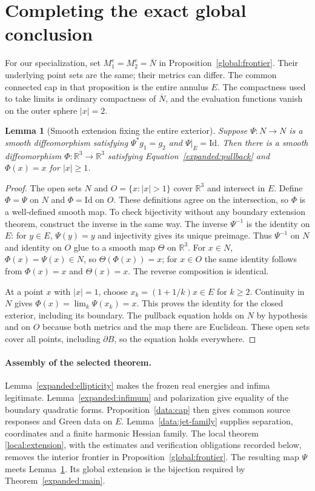 \documentclass[11pt]{article}
\newtheorem{lemma}[theorem]{Lemma}
\theoremstyle{definition}
\theoremstyle{remark}
\newcommand{\Id}{\mathrm{Id}}
\numberwithin{equation}{section}
\begin{document}
\section{Completing the exact global conclusion}\label{expanded:finish}

For our specialization, set $M_1^e=M_2^e=\overline N$ in
Proposition~\ref{global:frontier}. Their underlying point sets are the
same; their metrics can differ. The common connected cap in that
proposition is the entire annulus $E$. The compactness used to take
limits is ordinary compactness of $\overline N$, and the evaluation
functions vanish on the outer sphere $|x|=2$.

\begin{lemma}[Smooth extension fixing the entire exterior]
\label{expanded:exterior-extension}
Suppose $\Psi:N\to N$ is a smooth diffeomorphism satisfying
$\Psi^*g_1=g_2$ and $\Psi|_E=\Id$. Then there is a smooth
diffeomorphism $\Phi:\mathbb R^3\to\mathbb R^3$ satisfying
Equation~\eqref{expanded:pullback} and $\Phi(x)=x$ for $|x|\geq1$.
\end{lemma}
\begin{proof}
The open sets $N$ and $O=\{x:|x|>1\}$ cover $\mathbb R^3$ and
intersect in $E$. Define $\Phi=\Psi$ on $N$ and $\Phi=\Id$ on
$O$. These definitions agree on the intersection, so $\Phi$ is a
well-defined smooth map. To check bijectivity without any boundary
extension theorem, construct the inverse in the same way. The inverse
$\Psi^{-1}$ is the identity on $E$: for $y\in E$, $\Psi(y)=y$ and
injectivity gives its unique preimage. Thus $\Psi^{-1}$ on $N$ and
identity on $O$ glue to a smooth map $\Theta$ on $\mathbb R^3$.
For $x\in N$, $\Phi(x)=\Psi(x)\in N$, so
$\Theta(\Phi(x))=x$; for $x\in O$ the same identity follows from
$\Phi(x)=x$ and $\Theta(x)=x$. The reverse composition is identical.

At a point $x$ with $|x|=1$, choose $x_k=(1+1/k)x\in E$ for
$k\geq2$. Continuity in $N$ gives $\Phi(x)=\lim_k\Psi(x_k)=x$.
This proves the identity for the closed exterior, including its boundary.
The pullback equation holds on $N$ by hypothesis and on $O$ because
both metrics and the map there are Euclidean. These open sets cover
all points, including $\partial B$, so the equation holds everywhere.
\end{proof}

\paragraph{Assembly of the selected theorem.}
Lemma~\ref{expanded:ellipticity} makes the frozen real energies and
infima legitimate. Lemma~\ref{expanded:infimum} and polarization give
equality of the boundary quadratic forms. Proposition~\ref{data:cap}
then gives common source responses and Green data on $E$.
Lemma~\ref{data:jet-family} supplies separation, coordinates and a
finite harmonic Hessian family. The local theorem
\ref{local:extension}, with the estimates and verification obligations
recorded below, removes the interior frontier in
Proposition~\ref{global:frontier}. The resulting map $\Psi$ meets
Lemma~\ref{expanded:exterior-extension}. Its global extension is the
bijection required by Theorem~\ref{expanded:main}.
\end{document}

